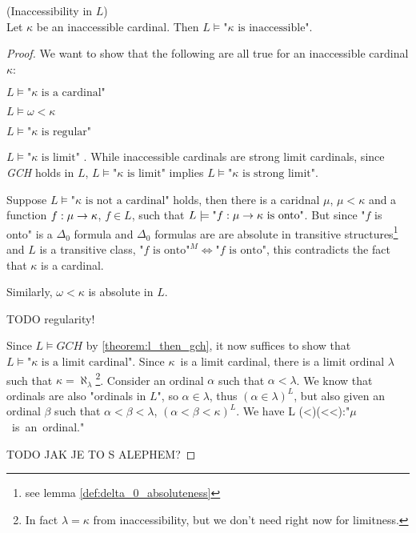 \begin{theorem}{(Inaccessibility in $L$)}\label{theorem:inaccessible_in_l}\\
Let $\kappa$ be an inaccessible cardinal. Then $L \models \mbox{"$\kappa$ is inaccessible"}$.
\end{theorem}
\begin{proof}
We want to show that the following are all true for an inaccessible cardinal $\kappa$:
\bce[(i)] 
\item $L \models \mbox{"$\kappa$ is a cardinal"}$
\item $L \models \omega < \kappa$
\item $L \models \mbox{"$\kappa$ is regular"}$
\item $L \models \mbox{"$\kappa$ is limit"}$ . While inaccessible cardinals are strong limit cardinals, since \emph{GCH} holds in $L$, $L \models \mbox{"$\kappa$ is limit"}$ implies $L \models \mbox{"$\kappa$ is strong limit"}$.
\ece

Suppose $L \models \mbox{"$\kappa$ is not a cardinal"}$ holds, then there is a caridnal $\mu$, $\mu < \kappa$ and a function $f:\mu\rightarrow\kappa$, $f \in L$, such that $L\models \mbox{"$f:\mu\rightarrow\kappa$ is onto"}$. But since "$f$ is onto" is a $\Delta_0$ formula and $\Delta_0$ formulas are are absolute in transitive structures\footnote{see lemma \ref{def:delta_0_absoluteness}} and $L$ is a transitive class, $\mbox{"$f$ is onto"}^M \iff \mbox{"$f$ is onto"}$, this contradicts the fact that $\kappa$ is a cardinal.

Similarly, $\omega < \kappa$ is absolute in $L$.

TODO regularity!

Since $L\models GCH$ by \ref{theorem:l_then_gch}, it now suffices to show that $L\models\mbox{"$\kappa$ is a limit cardinal"}$. Since $\kappa$ is a limit cardinal, there is a limit ordinal $\lambda$ such that $\kappa = \aleph_\lambda$\footnote{In fact $\lambda = \kappa$ from inaccessibility, but we don't need right now for limitness.}.
Consider an ordinal $\alpha$ such that $\alpha<\lambda$. We know that ordinals are also "ordinals in $L$", so $\alpha \in \lambda$, thus $(\alpha \in \lambda)^L$, but also given an ordinal $\beta$ such that $\alpha < \beta < \lambda$, $(\alpha < \beta < \kappa)^L$. We have 
L \models (\forall\alpha<\lambda)(\exists \alpha<\beta<\lambda):\mbox{"$\mu$ is an ordinal."}

TODO JAK JE TO S ALEPHEM?
\end{proof}

